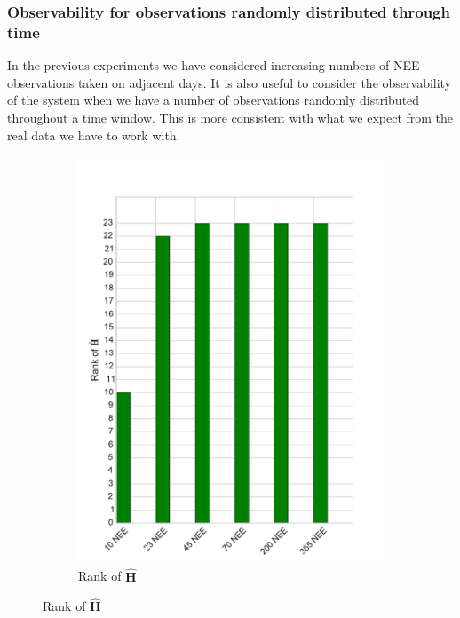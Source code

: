 \subsubsection{Observability for observations randomly distributed through time}

In the previous experiments we have considered increasing numbers of NEE observations taken on adjacent days. It is also useful to consider the observability of the system when we have a number of observations randomly distributed throughout a time window. This is more consistent with what we expect from the real data we have to work with.  

\begin{figure}[ht]
    \centering
    \begin{subfigure}[b]{0.4\textwidth}
        \includegraphics[width=\textwidth]{chapter/chapter5/dalec2_obsrankwind.pdf}
        \caption{Rank of $\hat{\textbf{H}}$}
        \label{chap5:fig:D2_observailityrankwind}
    \end{subfigure}

\end{figure}
